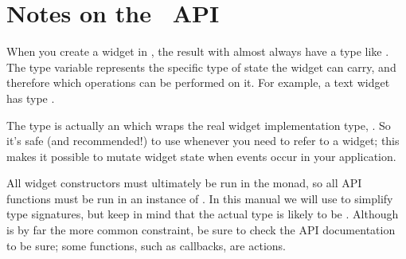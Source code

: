 \section{Notes on the \vtyui\ API}

When you create a widget in \vtyui, the result with almost always have
a type like .  The type variable  represents the
specific type of state the widget can carry, and therefore which
operations can be performed on it.  For example, a text widget has
type .

The  type is actually an  which wraps the real
widget implementation type, .  So it's safe (and
recommended!) to use  whenever you need to refer to a
widget; this makes it possible to mutate widget state when events
occur in your application.

All widget constructors must ultimately be run in the  monad,
so all API functions must be run in an instance of .  In
this manual we will use  to simplify type signatures, but keep
in mind that the actual type is likely to be .
Although  is by far the more common constraint, be sure to
check the API documentation to be sure; some functions, such as
callbacks, are  actions.
